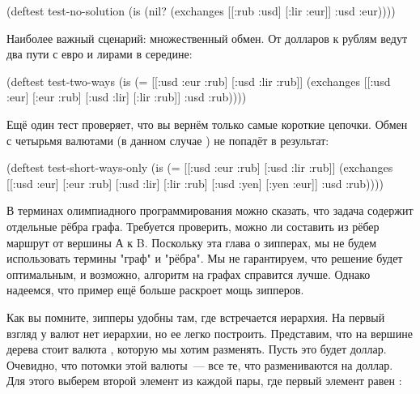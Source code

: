 \begin{english}
  \begin{clojure}
(deftest test-no-solution
  (is (nil? (exchanges [[:rub :usd] [:lir :eur]] :usd :eur))))
  \end{clojure}
\end{english}

Наиболее важный сценарий: множественный обмен. От долларов к рублям ведут два
пути с евро и лирами в середине:

\begin{english}
  \begin{clojure}
(deftest test-two-ways
  (is (= [[:usd :eur :rub]
          [:usd :lir :rub]]
         (exchanges [[:usd :eur]
                     [:eur :rub]
                     [:usd :lir]
                     [:lir :rub]] :usd :rub))))
  \end{clojure}
\end{english}

Ещё один тест проверяет, что вы вернём только самые короткие цепочки. Обмен с
четырьмя валютами (в данном случае ) не попадёт в
результат:

\begin{english}
  \begin{clojure}
(deftest test-short-ways-only
  (is (= [[:usd :eur :rub]
          [:usd :lir :rub]]
         (exchanges [[:usd :eur]
                     [:eur :rub]
                     [:usd :lir]
                     [:lir :rub]
                     [:usd :yen]
                     [:yen :eur]] :usd :rub))))
  \end{clojure}
\end{english}

В терминах олимпиадного программирования можно сказать, что задача содержит
отдельные рёбра графа. Требуется проверить, можно ли составить из рёбер маршрут
от вершины А к B. Поскольку эта глава о зипперах, мы не будем использовать
термины "граф" и "рёбра". Мы не гарантируем, что решение будет оптимальным, и
возможно, алгоритм на графах справится лучше. Однако надеемся, что пример ещё
больше раскроет мощь зипперов.

Как вы помните, зипперы удобны там, где встречается иерархия. На первый взгляд у
валют нет иерархии, но ее легко построить. Представим, что на вершине дерева
стоит валюта , которую мы хотим разменять. Пусть это будет
доллар. Очевидно, что потомки этой валюты~--- все те, что размениваются на
доллар. Для этого выберем второй элемент из каждой пары, где первый элемент
равен :

